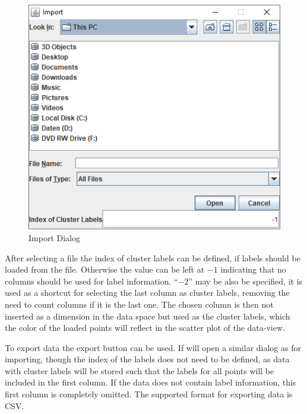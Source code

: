 \documentclass[
	a4paper,
	english,
	twoside,
	openright,               
	11pt                            
	]{report}
\begin{document}
\begin{figure}[h]
	\centering 
	\includegraphics[scale=.45]{data-import}%
	\caption{Import Dialog}
	\label{fig:data-import}
\end{figure}

After selecting a file the index of cluster labels can be defined, if labels should be loaded from the file. Otherwise the value can be left at $-1$ indicating that no columns should be used for label information. ``$-2$'' may be also be specified, it is used as a shortcut for selecting the last column as cluster labels, removing the need to count columns if it is the last one. The chosen column is then not inserted as a dimension in the data space but used as the cluster labels, which the color of the loaded points will reflect in the scatter plot of the data-view. 

To export data the export button can be used. If will open a similar dialog as for importing, though the index of the labels does not need to be defined, as data with cluster labels will be stored such that the labels for all points will be included in the first column. If the data does not contain label information, this first column is completely omitted. The supported format for exporting data is CSV.
\end{document}
